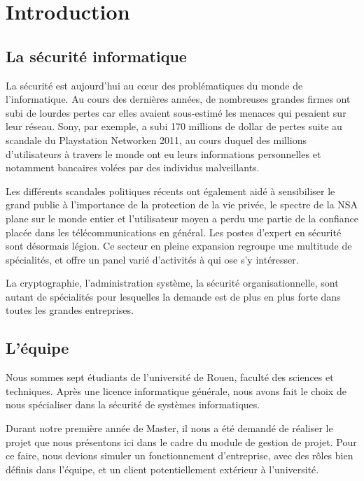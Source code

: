 \chapter{Introduction}

\section{La sécurité informatique}

La sécurité est aujourd'hui au cœur des problématiques du monde de l'informatique. Au cours des dernières années, de nombreuses grandes firmes ont subi de lourdes pertes car elles avaient sous-estimé les menaces qui pesaient sur leur réseau. Sony\textregistered, par exemple, a subi 170 millions de dollar\cite{PSN} de pertes suite au scandale du Playstation Network\texttrademark en 2011, au cours duquel des millions d'utilisateurs à travers le monde ont eu leurs informations personnelles et notamment bancaires volées par des individus malveillants.

 Les différents scandales politiques récents ont également aidé à sensibiliser le grand public à l'importance de la protection de la vie privée, le spectre de la NSA plane sur le monde entier et l'utilisateur moyen a perdu une partie de la confiance placée dans les télécommunications en général. Les postes d'expert en sécurité sont désormais légion. Ce secteur en pleine expansion regroupe une multitude de spécialités, et offre un panel varié d'activités à qui ose s'y intéresser.
 
La cryptographie, l'administration système, la sécurité organisationnelle, sont autant de spécialités pour lesquelles la demande est de plus en plus forte dans toutes les grandes entreprises.

\section{L'équipe}

Nous sommes sept étudiants de l'université de Rouen, faculté des sciences et techniques. Après une licence informatique générale, nous avons fait le choix de nous spécialiser dans la sécurité de systèmes informatiques.

 Durant notre première année de Master, il nous a été demandé de réaliser le projet que nous présentons ici dans le cadre du module de gestion de projet. Pour ce faire, nous devions simuler un fonctionnement d'entreprise, avec des rôles bien définis dans l'équipe, et un client potentiellement extérieur à l'université.
 
